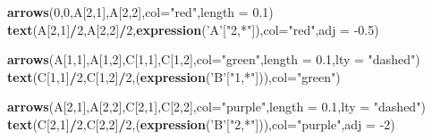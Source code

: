 \documentclass[
]{book}
\newenvironment{Shaded}{\begin{snugshade}}{\end{snugshade}}
\newcommand{\DataTypeTok}[1]{\textcolor[rgb]{0.13,0.29,0.53}{#1}}
\newcommand{\DecValTok}[1]{\textcolor[rgb]{0.00,0.00,0.81}{#1}}
\newcommand{\FloatTok}[1]{\textcolor[rgb]{0.00,0.00,0.81}{#1}}
\newcommand{\KeywordTok}[1]{\textcolor[rgb]{0.13,0.29,0.53}{\textbf{#1}}}
\newcommand{\NormalTok}[1]{#1}
\newcommand{\OperatorTok}[1]{\textcolor[rgb]{0.81,0.36,0.00}{\textbf{#1}}}
\newcommand{\StringTok}[1]{\textcolor[rgb]{0.31,0.60,0.02}{#1}}
\theoremstyle{definition}
\theoremstyle{definition}
\theoremstyle{definition}
\theoremstyle{remark}
\begin{document}
\begin{Shaded}
\begin{Highlighting}[]
\KeywordTok{arrows}\NormalTok{(}\DecValTok{0}\NormalTok{,}\DecValTok{0}\NormalTok{,A[}\DecValTok{2}\NormalTok{,}\DecValTok{1}\NormalTok{],A[}\DecValTok{2}\NormalTok{,}\DecValTok{2}\NormalTok{],}\DataTypeTok{col=}\StringTok{"red"}\NormalTok{,}\DataTypeTok{length =} \FloatTok{0.1}\NormalTok{)}
\KeywordTok{text}\NormalTok{(A[}\DecValTok{2}\NormalTok{,}\DecValTok{1}\NormalTok{]}\OperatorTok{/}\DecValTok{2}\NormalTok{,A[}\DecValTok{2}\NormalTok{,}\DecValTok{2}\NormalTok{]}\OperatorTok{/}\DecValTok{2}\NormalTok{,}\KeywordTok{expression}\NormalTok{(}\StringTok{'A'}\NormalTok{[}\StringTok{"2,*"}\NormalTok{]),}\DataTypeTok{col=}\StringTok{"red"}\NormalTok{,}\DataTypeTok{adj =} \FloatTok{-0.5}\NormalTok{)}


\KeywordTok{arrows}\NormalTok{(A[}\DecValTok{1}\NormalTok{,}\DecValTok{1}\NormalTok{],A[}\DecValTok{1}\NormalTok{,}\DecValTok{2}\NormalTok{],C[}\DecValTok{1}\NormalTok{,}\DecValTok{1}\NormalTok{],C[}\DecValTok{1}\NormalTok{,}\DecValTok{2}\NormalTok{],}\DataTypeTok{col=}\StringTok{"green"}\NormalTok{,}\DataTypeTok{length =} \FloatTok{0.1}\NormalTok{,}\DataTypeTok{lty =} \StringTok{"dashed"}\NormalTok{)}
\KeywordTok{text}\NormalTok{(C[}\DecValTok{1}\NormalTok{,}\DecValTok{1}\NormalTok{]}\OperatorTok{/}\DecValTok{2}\NormalTok{,C[}\DecValTok{1}\NormalTok{,}\DecValTok{2}\NormalTok{]}\OperatorTok{/}\DecValTok{2}\NormalTok{,(}\KeywordTok{expression}\NormalTok{(}\StringTok{'B'}\NormalTok{[}\StringTok{"1,*"}\NormalTok{])),}\DataTypeTok{col=}\StringTok{"green"}\NormalTok{)}

\KeywordTok{arrows}\NormalTok{(A[}\DecValTok{2}\NormalTok{,}\DecValTok{1}\NormalTok{],A[}\DecValTok{2}\NormalTok{,}\DecValTok{2}\NormalTok{],C[}\DecValTok{2}\NormalTok{,}\DecValTok{1}\NormalTok{],C[}\DecValTok{2}\NormalTok{,}\DecValTok{2}\NormalTok{],}\DataTypeTok{col=}\StringTok{"purple"}\NormalTok{,}\DataTypeTok{length =} \FloatTok{0.1}\NormalTok{,}\DataTypeTok{lty =} \StringTok{"dashed"}\NormalTok{)}
\KeywordTok{text}\NormalTok{(C[}\DecValTok{2}\NormalTok{,}\DecValTok{1}\NormalTok{]}\OperatorTok{/}\DecValTok{2}\NormalTok{,C[}\DecValTok{2}\NormalTok{,}\DecValTok{2}\NormalTok{]}\OperatorTok{/}\DecValTok{2}\NormalTok{,(}\KeywordTok{expression}\NormalTok{(}\StringTok{'B'}\NormalTok{[}\StringTok{"2,*"}\NormalTok{])),}\DataTypeTok{col=}\StringTok{"purple"}\NormalTok{,}\DataTypeTok{adj =} \DecValTok{-2}\NormalTok{)}



\end{Highlighting}
\end{Shaded}
\end{document}
